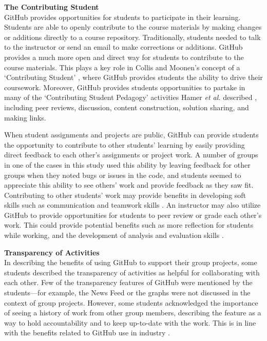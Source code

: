 \textbf{The Contributing Student} \\
GitHub provides opportunities for students to participate in their learning. Students are able to openly contribute to the course materials by making changes or additions directly to a course repository. Traditionally, students needed to talk to the instructor or send an email to make corrections or additions. GitHub provides a much more open and direct way for students to contribute to the course materials. This plays a key role in Collis and Moonen's concept of a `Contributing Student' \cite{collis2006contributing}, where GitHub provides students the ability to drive their coursework. Moreover, GitHub provides students opportunities to partake in many of the `Contributing Student Pedagogy' activities Hamer \textit{et al.} described \cite{hamer2011tools}, including peer reviews, discussion, content construction, solution sharing, and making links.

When student assignments and projects are public, GitHub can provide students the opportunity to contribute to other students' learning by easily providing direct feedback to each other's assignments or project work. A number of groups in one of the cases in this study used this ability by leaving feedback for other groups when they noted bugs or issues in the code, and students seemed to appreciate this ability to see others' work and provide feedback as they saw fit. Contributing to other students' work may provide benefits in developing soft skills such as communication and teamwork skills \cite{hamer2006some}. An instructor may also utilize GitHub to provide opportunities for students to peer review or grade each other's work. This could provide potential benefits such as more reflection for students while working, and the development of analysis and evaluation skills \cite{sondergaard2012collaborative}.


\textbf{Transparency of Activities} \\
In describing the benefits of using GitHub to support their group projects, some students described the transparency of activities as helpful for collaborating with each other. Few of the transparency features of GitHub were mentioned by the students---for example, the News Feed or the graphs were not discussed in the context of group projects. However, some students acknowledged the importance of seeing a history of work from other group members, describing the feature as a way to hold accountability and to keep up-to-date with the work. This is in line with the benefits related to GitHub use in industry \cite{dabbish2012social}.

